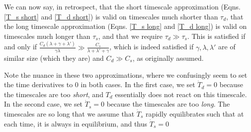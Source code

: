 We can now say, in retrospect, that the short timescale approximation (Eqns. \ref{T_s short} and \ref{T_d short}) is valid on timescales much shorter than $\tau_d$, that the long timescale approximation (Eqns. \ref{T_s long} and \ref{T_d long}) is valid on timescales much longer than $\tau_s$, and that we require $\tau_d\gg \tau_s$. This is satisfied if and only if $\frac{C_d(\lambda+\gamma+\lambda')}{\gamma\lambda}\gg\frac{C_s}{\lambda+\lambda'+\gamma}$, which is indeed satisfied if $\gamma,\lambda,\lambda'$ are of similar size (which they are) and $C_d\gg C_s$, as originally assumed.

Note the nuance in these two approximations, where we confusingly seem to set the time derivatives to $0$ in both cases. In the first case, we set $\dot T_d=0$ because the timescales are too \textit{short}, and $T_d$ essentially does not react on this timescale. In the second case, we set $\dot T_s=0$ because the timescales are too \textit{long}. The timescales are so long that we assume that $\dot T_s$ rapidly equilibrates such that at each time, it is always in equilibrium, and thus $\dot T_s=0$

